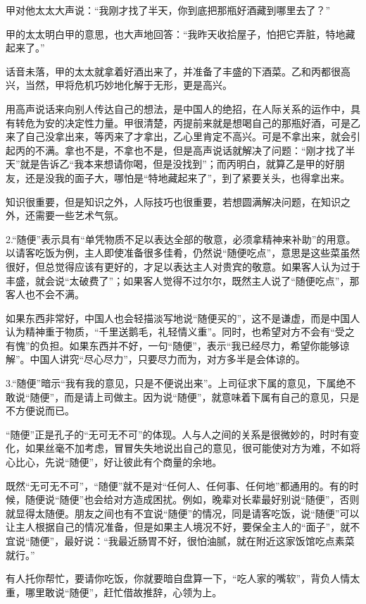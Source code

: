 \documentclass[fontset=fandol, a4paper, 12pt, openright]{ctexbook}
\begin{document}
甲对他太太大声说：“我刚才找了半天，你到底把那瓶好酒藏到哪里去了？”

甲的太太明白甲的意思，也大声地回答：“我昨天收拾屋子，怕把它弄脏，特地藏起来了。”

话音未落，甲的太太就拿着好酒出来了，并准备了丰盛的下酒菜。乙和丙都很高兴，当然，甲将危机巧妙地化解于无形，更是高兴。

用高声说话来向别人传达自己的想法，是中国人的绝招，在人际关系的运作中，具有转危为安的决定性力量。甲很清楚，丙提前来就是想喝自己的那瓶好酒，可是乙来了自己没拿出来，等丙来了才拿出，乙心里肯定不高兴。可是不拿出来，就会引起丙的不满。拿也不是，不拿也不是，但是高声说话就解决了问题：“刚才找了半天”就是告诉乙“我本来想请你喝，但是没找到”；而丙明白，就算乙是甲的好朋友，还是没我的面子大，哪怕是“特地藏起来了”，到了紧要关头，也得拿出来。

知识很重要，但是知识之外，人际技巧也很重要，若想圆满解决问题，在知识之外，还需要一些艺术气氛。

2.“随便”表示具有“单凭物质不足以表达全部的敬意，必须拿精神来补助”的用意。以请客吃饭为例，主人即使准备很多佳肴，仍然说“随便吃点”，意思是这些菜虽然很好，但总觉得应该有更好的，才足以表达主人对贵宾的敬意。如果客人认为过于丰盛，就会说“太破费了”；如果客人觉得不过尔尔，既然主人说了“随便吃点”，那客人也不会不满。

如果东西非常好，中国人也会轻描淡写地说“随便买的”，这不是谦虚，而是中国人认为精神重于物质，“千里送鹅毛，礼轻情义重”。同时，也希望对方不会有“受之有愧”的负担。如果东西并不好，一句“随便”，表示“我已经尽力，希望你能够谅解”。中国人讲究“尽心尽力”，只要尽力而为，对方多半是会体谅的。

3.“随便”暗示“我有我的意见，只是不便说出来”。上司征求下属的意见，下属绝不敢说“随便”，而是请上司做主。因为说“随便”，就意味着下属有自己的意见，只是不方便说而已。

“随便”正是孔子的“无可无不可”的体现。人与人之间的关系是很微妙的，时时有变化，如果丝毫不加考虑，冒冒失失地说出自己的意见，很可能使对方为难，不如将心比心，先说“随便”，好让彼此有个商量的余地。

既然“无可无不可”，“随便”就不是对“任何人、任何事、任何地”都通用的。有的时候，随便说“随便”也会给对方造成困扰。例如，晚辈对长辈最好别说“随便”，否则就显得太随便。朋友之间也有不宜说“随便”的情况，同是请客吃饭，说“随便”可以让主人根据自己的情况准备，但是如果主人境况不好，要保全主人的“面子”，就不宜说“随便”，最好说：“我最近肠胃不好，很怕油腻，就在附近这家饭馆吃点素菜就行。”

有人托你帮忙，要请你吃饭，你就要暗自盘算一下，“吃人家的嘴软”，背负人情太重，哪里敢说“随便”，赶忙借故推辞，心领为上。
\end{document}
